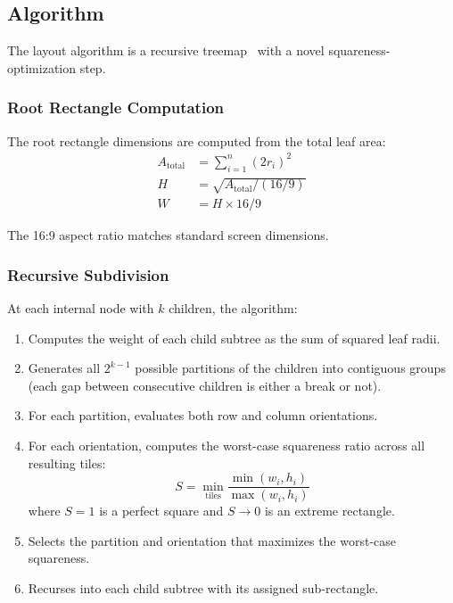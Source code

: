 \documentclass[11pt, letterpaper]{article}
\begin{document}
\subsection{Algorithm}

The layout algorithm is a recursive treemap~\cite{treemap} with a novel squareness-optimization step.

\subsubsection{Root Rectangle Computation}

The root rectangle dimensions are computed from the total leaf area:
\begin{align}
    A_{\text{total}} &= \sum_{i=1}^{n} (2r_i)^2 \\
    H &= \sqrt{A_{\text{total}} / (16/9)} \\
    W &= H \times 16/9
\end{align}

The 16:9 aspect ratio matches standard screen dimensions.

\subsubsection{Recursive Subdivision}

At each internal node with $k$ children, the algorithm:

\begin{enumerate}
    \item Computes the weight of each child subtree as the sum of squared leaf radii.
    \item Generates all $2^{k-1}$ possible partitions of the children into contiguous groups (each gap between consecutive children is either a break or not).
    \item For each partition, evaluates both row and column orientations.
    \item For each orientation, computes the worst-case squareness ratio across all resulting tiles:
    \begin{equation}
        S = \min_{\text{tiles}} \frac{\min(w_i, h_i)}{\max(w_i, h_i)}
    \end{equation}
    where $S = 1$ is a perfect square and $S \to 0$ is an extreme rectangle.
    \item Selects the partition and orientation that maximizes the worst-case squareness.
    \item Recurses into each child subtree with its assigned sub-rectangle.
\end{enumerate}
\end{document}
